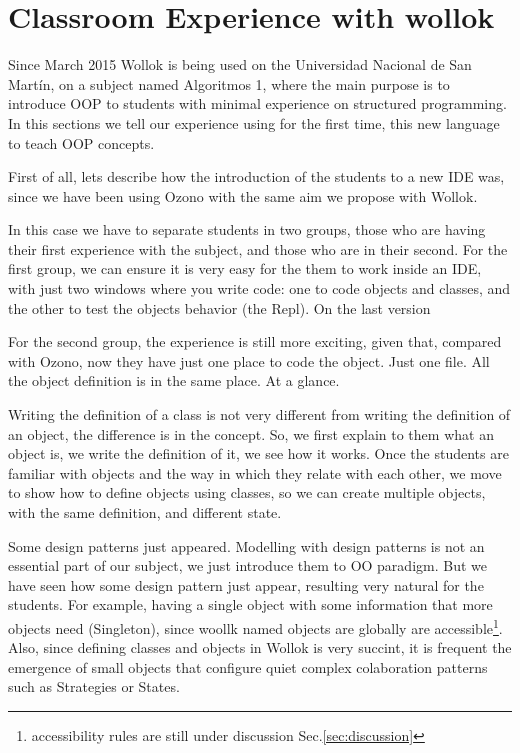 \section{Classroom Experience with wollok}
\label{experience}

Since March 2015 Wollok is being used on the Universidad Nacional de San Martín, on a subject named Algoritmos 1, where the main purpose is to introduce OOP to students with minimal experience on structured programming.
In this sections we tell our experience using for the first time, this new language to teach OOP concepts.

First of all, lets  describe how the introduction of the students to a new IDE was, since we have been using Ozono with the same aim we propose with Wollok. 



In this case we have to separate students in two groups,  those who are having their first experience with the subject, and those who are in their second.
For the first group, we can ensure it is very easy for the them to work inside an IDE, with just two windows where you write code: one to code  objects and classes, and the other to test the objects behavior (the Repl). On the last version

For the second group, the experience is still more exciting, given that, compared with Ozono, now they have just one place to code the object. Just one file. All the object definition is in the same place. At a glance.


Writing the definition of a class is not very different from writing the definition of an object, the difference is in the concept. So, we first explain to them what an object is, we write the definition of it, we see how it works. Once the students are familiar with objects and the way in which they relate with each other, we move to show how to define objects using classes, so we can create multiple objects, with the same definition, and different state.

Some design patterns just appeared. Modelling with design patterns is not an essential part of our subject, we just introduce them to OO paradigm. But we have seen how some design pattern just appear, resulting very natural for the students. For example, having a single object with some information that more objects need (Singleton), since woollk named objects are globally are accessible\footnote{accessibility rules are still under discussion \cf Sec.\ref{sec:discussion}}. Also, since defining classes and objects in Wollok is very succint, it is frequent the emergence of small objects that configure quiet complex colaboration patterns such as Strategies or States\cite{Gamm93b}.



